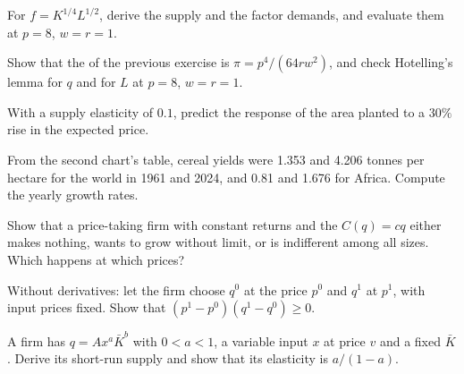 \begin{exercise}[$\star\star$]\label{exo:b1:profit-maximisation:cd}
For $f = K^{1/4}L^{1/2}$, derive the supply and the factor demands, and evaluate
them at $p = 8$, $w = r = 1$.
\end{exercise}

\begin{exercise}[$\star\star$]\label{exo:b1:profit-maximisation:hotelling-check}
Show that the  of the previous exercise is
$\pi = p^4/(64rw^2)$, and check Hotelling's lemma for $q$ and for $L$ at $p = 8$,
$w = r = 1$.
\end{exercise}

\begin{exercise}[$\star\star$]\label{exo:b1:profit-maximisation:predict}
With a supply elasticity of $0.1$, predict the response of the area planted
to a $30\%$ rise in the expected price.
\end{exercise}

\begin{exercise}[$\star\star$]\label{exo:b1:profit-maximisation:yield}
From the second chart's table, cereal yields were 1.353 and 4.206 tonnes per
hectare for the world in 1961 and 2024, and 0.81 and 1.676 for
Africa. %
Compute the yearly growth rates.
\end{exercise}

\begin{exercise}[$\star\star$]\label{exo:b1:profit-maximisation:crs}
Show that a price-taking firm with constant returns and the 
$C(q) = cq$ either makes nothing, wants to grow without limit, or is
indifferent among all sizes. Which happens at which prices?
\end{exercise}

\begin{exercise}[$\star\star\star$]\label{exo:b1:profit-maximisation:convex}
Without derivatives: let the firm choose $q^0$ at the price $p^0$ and $q^1$ at
$p^1$, with input prices fixed. Show that $(p^1 - p^0)(q^1 - q^0) \ge 0$.
\end{exercise}

\begin{exercise}[$\star\star\star$]\label{exo:b1:profit-maximisation:fixed-factor}
A firm has $q = Ax^a\bar K^b$ with $0 < a < 1$, a variable input $x$ at price $v$ and
a fixed $\bar K$. Derive its short-run supply and show that its elasticity is
$a/(1 - a)$.
\end{exercise}

